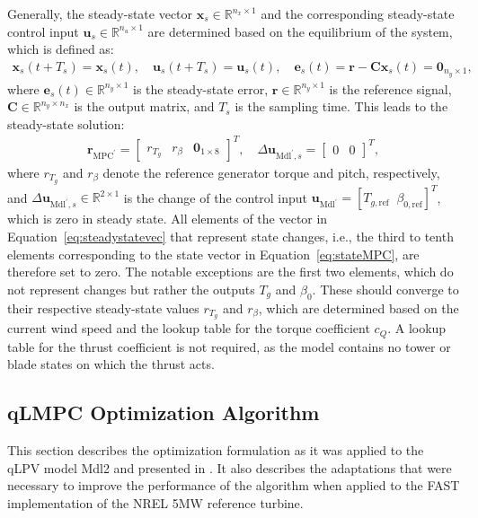 Generally, the steady-state vector $\bm{x}_{s} \in \mathbb{R}^{n_x \times 1}$ and the corresponding steady-state control input $\bm{u}_{s} \in \mathbb{R}^{n_u \times 1}$ are determined based on the equilibrium of the system, which is defined as:
\begin{align*}
    \bm{x}_{s}(t + T_s) = \bm{x}_{s}(t),  \quad \bm{u}_{s}(t + T_s) = \bm{u}_{s}(t), \quad
    \bm{e}_s(t) = \bm{r} - \bm{C} \bm{x}_{s}(t) = \bm{0}_{n_y \times 1},
\end{align*}
%
where $\bm{e}_s(t) \in \mathbb{R}^{n_y \times 1}$ is the steady-state error, $\bm{r} \in \mathbb{R}^{n_y \times 1}$ is the reference signal, $\bm{C} \in \mathbb{R}^{n_y \times n_x}$ is the output matrix, and $T_s$ is the sampling time. This leads to the steady-state solution:
\begin{align} \label{eq:steadystatevec}
    \bm{r}_{\text{MPC}^\prime} = \begin{bmatrix} r_{T_g} & r_{\beta} & \bm{0}_{1 \times 8} \end{bmatrix}^T, \quad
    \Delta\bm{u}_{\text{Mdl}^\prime\!,s} = \begin{bmatrix} 0 & 0 \end{bmatrix}^T,
\end{align}
where \(r_{T_g}\) and \(r_{\beta}\) denote the reference generator torque and pitch, respectively, and $\Delta\bm{u}_{\text{Mdl}^\prime,s} \in \mathbb{R}^{2 \times 1}$ is the change of the control input $\bm{u}_{\text{Mdl}^\prime} = [T_{g,\text{ref}} \;\; \beta_{0,\text{ref}}]^T$, which is zero in steady state. All elements of the vector in Equation~\eqref{eq:steadystatevec} that represent state changes, i.e., the third to tenth elements corresponding to the state vector in Equation~\eqref{eq:stateMPC}, are therefore set to zero.
The notable exceptions are the first two elements, which do not represent changes but rather the outputs \( T_g \) and \( \beta_0 \). These should converge to their respective steady-state values \( r_{T_g} \) and \( r_{\beta} \), which are determined based on the current wind speed and the lookup table for the torque coefficient $c_Q$. A lookup table for the thrust coefficient is not required, as the model contains no tower or blade states on which the thrust acts.

\subsection{qLMPC Optimization Algorithm}\label{sec:qLMPCOptimizationAlgo}
This section describes the optimization formulation as it was applied to the qLPV model Mdl2 and presented in \cite{dittmer2021velocity}. It also describes the adaptations that were necessary to improve the performance of the algorithm when applied to the FAST implementation of the NREL 5MW reference turbine.

